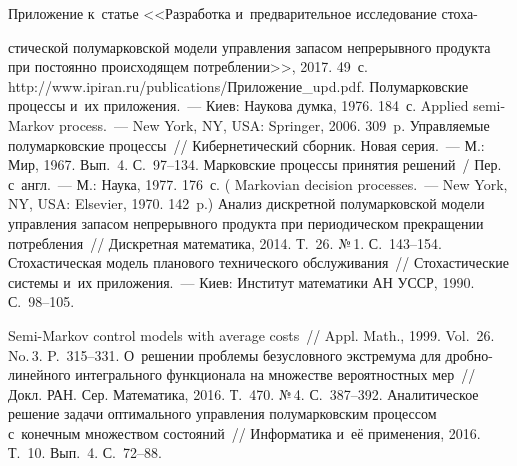 \begin{multicols}{2}
\vspace*{-10pt}
  
{\small\frenchspacing
 {%
 \begin{thebibliography}{99}
   Приложение к~статье <<Разработка 
и~предварительное исследование стоха-\linebreak\vspace*{-12pt}

\columnbreak

\noindent
стической полумарковской модели управ\-ле\-ния 
запасом непрерывного продукта при постоянно происходящем потреблении>>, 2017. 49~с. 
{\sf http://www.\linebreak ipiran.ru/publications/Приложение\_upd.pdf}.
   Полумарковские процессы и~их приложения.~--- Киев: 
Наукова думка, 1976. 184~с.
 Applied semi-Markov process.~--- New York, NY, USA: Springer, 
2006. 309~p.
   Управляемые полумарковские процессы~// Кибернетический сборник. 
Новая серия.~--- М.: Мир, 1967. Вып.~4. С.~97--134.
 Марковские процессы принятия решений~/ Пер. с~англ.~--- М.: 
Наука, 1977. 176~с. ( Markovian decision processes.~--- New York, NY, 
USA: Elsevier, 1970. 142~p.)
   Анализ дискретной полумарковской модели 
управления запасом непрерывного продукта при периодическом прекращении 
потребления~// Дискретная математика, 2014. Т.~26. №\,1. С.~143--154. 
   Стохастическая модель планового технического обслуживания~// 
  Стохастические сис\-те\-мы и~их приложения.~---
   Киев: Институт  математики АН УССР, 1990. С.~98--105.

   Semi-Markov control models with average 
costs~// Appl. Math., 1999. Vol.~26. No.\,3. P.~315--331.
   О~решении проблемы безусловного экстремума для  
дроб\-но-ли\-ней\-но\-го интегрального функционала на множестве вероятностных мер~// 
Докл. РАН. Сер. Математика, 2016. Т.~470. №\,4. С.~387--392.
   Аналитическое решение задачи 
оптимального управления полумарковским процессом с~конечным множеством состояний~// 
Информатика и~её применения, 2016. Т.~10. Вып.~4. С.~72--88.

 \end{thebibliography}

 }
 }

\end{multicols}

